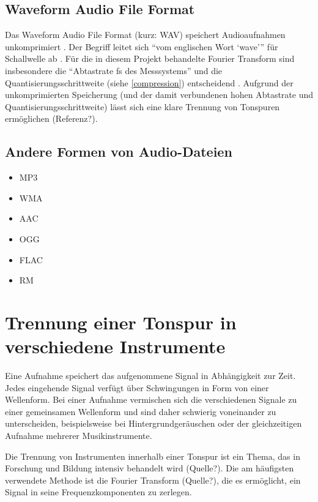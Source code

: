 %
\subsection{Waveform Audio File Format}
%

Das Waveform Audio File Format (kurz: WAV) speichert Audioaufnahmen unkomprimiert \parencite{what_is_a_wav_file}. Der Begriff leitet sich \enquote{vom englischen Wort \enquote{wave}} für Schallwelle ab \parencite{wav}. Für die in diesem Projekt behandelte Fourier Transform sind insbesondere die \enquote{Abtastrate fs des Messsystems} und die Quantisierungsschrittweite (siehe \cref{compression}) entscheidend  \parencite{FFT_grundlagen}. Aufgrund der unkomprimierten Speicherung (und der damit verbundenen hohen Abtastrate und Quantisierungsschrittweite) lässt sich eine klare Trennung von Tonspuren ermöglichen (Referenz?).


%
\subsection{Andere Formen von Audio-Dateien}
\label{audio_representations}
%

%
\begin{itemize}
    \item MP3
    \item WMA
    \item AAC
    \item OGG
    \item FLAC
    \item RM
\end{itemize}
%

\parencite{audioformate_im_überblick}

%
\section{Trennung einer Tonspur in verschiedene Instrumente}
%

Eine Aufnahme speichert das aufgenommene Signal in Abhängigkeit zur Zeit. Jedes eingehende Signal verfügt über Schwingungen in Form von einer Wellenform. Bei einer Aufnahme vermischen sich die verschiedenen Signale zu einer gemeinsamen Wellenform und sind daher schwierig voneinander zu unterscheiden, beispielsweise bei Hintergrundgeräuschen oder der gleichzeitigen Aufnahme mehrerer Musikinstrumente.

\par

Die Trennung von Instrumenten innerhalb einer Tonspur ist ein Thema, das in Forschung und Bildung intensiv behandelt wird (Quelle?). Die am häufigsten verwendete Methode ist die Fourier Transform (Quelle?), die es ermöglicht, ein Signal in seine Frequenzkomponenten zu zerlegen.

